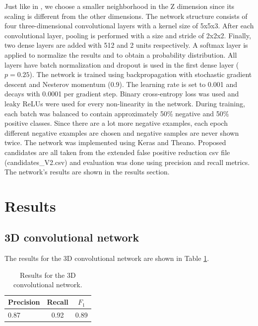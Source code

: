 \documentclass{article}
\begin{document}
Just like in \cite{qidou}, we choose a smaller neighborhood in the Z dimension since its scaling is different from the other dimensions.
The network structure consists of four three-dimensional convolutional layers with a kernel size of 5x5x3.
After each convolutional layer, pooling is performed with a size and stride of 2x2x2.
Finally, two dense layers are added with 512 and 2 units respectively.
A softmax layer is applied to normalize the results and to obtain a probability distribution.
All layers have batch normalization and dropout is used in the first dense layer ($p=0.25$).
The network is trained using backpropagation with stochastic gradient descent and Nesterov momentum (0.9).
The learning rate is set to 0.001 and decays with 0.0001 per gradient step.
Binary cross-entropy loss was used and leaky ReLUs were used for every non-linearity in the network.
During training, each batch was balanced to contain approximately 50\% negative and 50\% positive classes.
Since there are a lot more negative examples, each epoch different negative examples are chosen and negative samples are never shown twice.
The network was implemented using Keras and Theano.
Proposed candidates are all taken from the extended false positive reduction csv file (candidates\_V2.csv) and evaluation was done using precision and recall metrics.
The network's results are shown in the results section.


\section{Results}\label{sec:results}
\subsection{3D convolutional network}
The results for the 3D convolutional network are shown in Table \ref{tbl:results_3d}.
\begin{table}[h!]
	\centering

	\begin{tabular}{l|cc}
	\hline

	\hline
	\textbf{Precision} & \textbf{Recall} & \textbf{$F_1$}\\
	\hline
		 0.87 & 0.92 & 0.89\\
	\hline

	\hline
	\end{tabular}
	\caption{Results for the 3D convolutional network.}
	\label{tbl:results_3d}
\end{table}
\end{document}

